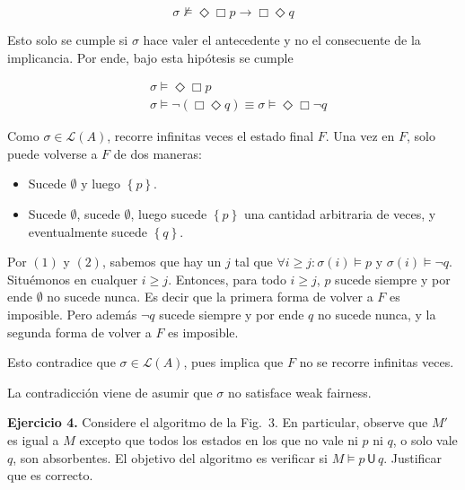 \documentclass[a4paper, 12pt]{article}
\begin{document}
\begin{equation*}
    \sigma \not\vDash \Diamond \Box p \to \Box \Diamond q
\end{equation*}

Esto solo se cumple si $\sigma$ hace valer el antecedente y no el consecuente de
la implicancia. Por ende, bajo esta hipótesis se cumple 

\begin{align}
    &\sigma \vDash \Diamond \Box p \\ 
    &\sigma \vDash \neg (\Box \Diamond q) \equiv \sigma \vDash \Diamond \Box
    \neg q
\end{align}

Como $\sigma \in \mathcal{L}(A)$, recorre infinitas veces el estado final $F$. Una
vez en $F$, solo puede volverse a $F$ de dos maneras:

\begin{itemize}
    \item Sucede $\emptyset$ y luego $\left\{ p \right\} $.
    \item Sucede $\emptyset$, sucede $\emptyset$, luego sucede $\left\{ p
        \right\} $ una cantidad arbitraria de veces, y eventualmente sucede
        $\left\{ q \right\} $.
\end{itemize}

Por $(1)$ y $(2)$, sabemos que hay un $j$ tal que $\forall i \geq j : \sigma(i)
\vDash p$ y $\sigma(i) \vDash  \neg q$. Situémonos en cualquer $i \geq j$.
Entonces, para todo $i \geq j$, $p$ sucede siempre y por ende $\emptyset$ no
sucede nunca. Es decir que la primera forma de volver a $F$ es imposible. Pero
además $\neg q$ sucede siempre y por ende $q$  no sucede nunca, y la segunda
forma de volver a $F$ es imposible. 

Esto contradice que $\sigma \in \mathcal{L}(A)$, pues implica que $F$ no se
recorre infinitas veces.

La contradicción viene de asumir que $\sigma$ no satisface weak fairness.
\pagebreak

\textbf{Ejercicio 4.} Considere el algoritmo de la Fig.~3. En particular,
observe que $M'$ es igual a $M$ excepto que todos los estados en los que no vale
ni $p$ ni $q$, o solo vale $q$, son absorbentes. El objetivo del algoritmo es
verificar si $M \models p \,\mathsf{U}\, q$. Justificar que es correcto.
\hfill
\end{document}
